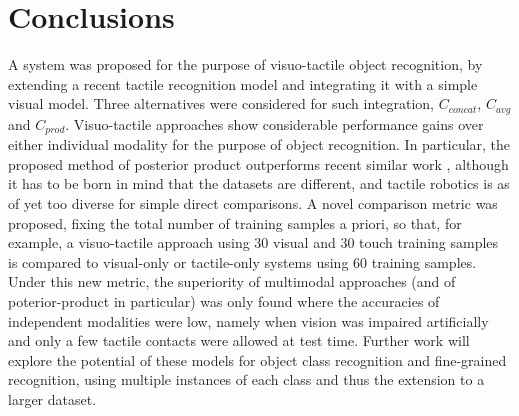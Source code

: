 \documentclass[9pt,technote]{IEEEtran}  %
\begin{document}
\section{Conclusions}
A system was proposed for the purpose of visuo-tactile object recognition, by extending a recent tactile recognition model \cite{Corradi2015} and integrating it with a simple visual model. Three alternatives were considered for such integration, $C_{concat}$, $C_{avg}$ and $C_{prod}$. Visuo-tactile approaches show considerable performance gains over either individual modality for the purpose of object recognition. In particular, the proposed method of posterior product outperforms recent similar work \cite{Yang2015}, although it has to be born in mind that the datasets are different, and tactile robotics is as of yet too diverse for simple direct comparisons. A novel comparison metric was proposed, fixing the total number of training samples a priori, so that, for example, a visuo-tactile approach using 30 visual and 30 touch training samples is compared to visual-only or tactile-only systems using 60 training samples. Under this new metric, the superiority of multimodal approaches (and of poterior-product in particular) was only found where the accuracies of independent modalities were low, namely when vision was impaired artificially and only a few tactile contacts were allowed at test time. Further work will explore the potential of these models for object class recognition and fine-grained recognition, using multiple instances of each class and thus the extension to a larger dataset.
	



	
\end{document}
